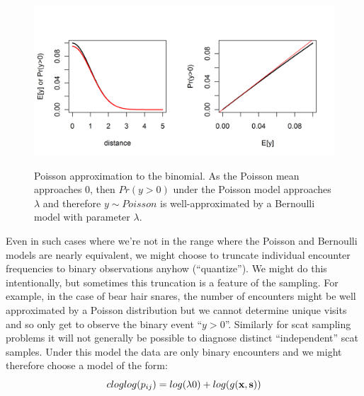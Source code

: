 \begin{figure}
\centering
\includegraphics[width=5in,height=2.5in]{Ch5/figs/Poisson-Bern.png}
\caption{Poisson approximation to the binomial. As the Poisson mean
  approaches 0, then $Pr(y>0)$ under the Poisson model approaches
  $\lambda$ and therefore $y \sim Poisson$ is well-approximated by a
  Bernoulli model with parameter $\lambda$.
}
\label{poisson-mn.fig.poissonbern}
\end{figure}

Even in such cases where we're not in the range where the Poisson and
Bernoulli models are nearly equivalent,
we might choose to truncate  individual encounter frequencies
to binary observations anyhow (``quantize'').
We might do
this intentionally, but sometimes this truncation is a feature of the
sampling. For example, in the case of bear hair snares, the number of
encounters might be well approximated by a Poisson distribution but we
cannot determine unique visits and so only get to observe the binary
event ``$y>0$''. Similarly for scat sampling problems it will not
generally be possible to diagnose distinct ``independent'' scat
samples. Under this model the data are only binary encounters and we
might therefore choose a model of the form:
\[
 cloglog(p_{ij}) = log(\lambda0)  + log(g({\bf x},{\bf s}))
\]

